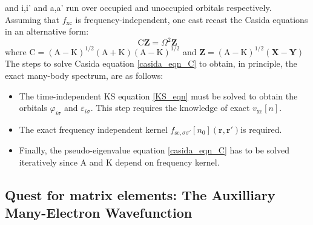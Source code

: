 and i,i' and a,a' run over occupied and unoccupied orbitals respectively. Assuming that $f_{\text{xc}}$ is frequency-independent, one cast recast the Casida equations in an alternative form:
\begin{equation}\label{casida_eqn_C}
    \text{C}\mathbf{Z} = \Omega^2\mathbf{Z}
\end{equation}
where $\text{C} = (\text{A}-\text{K})^{1/2}(\text{A}+\text{K})(\text{A}-\text{K})^{1/2}$ and $\mathbf{Z} = (\text{A}-\text{K})^{1/2}(\mathbf{X}-\mathbf{Y})$
The steps to solve Casida equation \eqref{casida_eqn_C} to obtain, in principle, the exact many-body spectrum, are as follows: 
\begin{itemize}
    \item The time-independent KS equation \eqref{KS_eqn} must be solved to obtain the orbitals $\varphi_{i\sigma}$ and $\varepsilon_{i\sigma}$. This step requires the knowledge of exact $v_{\text{xc}}[n]$.  
    \item The exact frequency independent kernel $f_{\text{sc},\sigma\sigma'}[n_0](\mathbf{r},\mathbf{r}')$is required.
    \item Finally, the pseudo-eigenvalue equation \eqref{casida_eqn_C} has to be solved iteratively since A and K depend on frequency kernel. 
\end{itemize}
\subsection{Quest for matrix elements: The Auxilliary Many-Electron Wavefunction}

